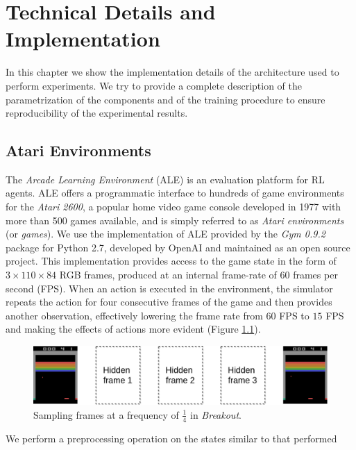 \chapter{Technical Details and Implementation}
\label{chapter5_technical_details}
\thispagestyle{empty}

\vspace{0.5cm}

In this chapter we show the implementation details of the architecture
used to perform experiments. We try to provide a complete description of the 
parametrization of the components and of the training procedure to ensure 
reproducibility of the experimental results.

\section{Atari Environments}
The \textit{Arcade Learning Environment} (ALE) \cite{bellemare2013arcade} is an 
evaluation platform for RL agents.
ALE offers a programmatic interface to hundreds of game environments for the 
\textit{Atari 2600}, a popular home video game console developed in 1977 with 
more than 500 games available, and is simply referred to as 
\textit{Atari environments} (or \textit{games}). 
We use the implementation of ALE provided by the \textit{Gym 0.9.2} package for 
Python 2.7, developed by OpenAI and maintained as an open source project. 
This implementation provides access to the game state in the form of 
$3 \times 110 \times 84$ RGB frames, produced at an internal frame-rate of $60$ 
frames per second (FPS).
When an action is executed in the environment, the simulator repeats the action 
for four consecutive frames of the game and then provides another observation, 
effectively lowering the frame rate from $60$ FPS to $15$ FPS and making the 
effects of actions more evident (Figure \ref{f:sampling}). 
%
\begin{figure}[h]
\includegraphics[width=\textwidth]{pictures/sampling}
\centering
\caption[Sampling frames at a frequency of $\frac{1}{4}$ in \textit{Breakout}]{Sampling frames at a frequency of $\frac{1}{4}$ in \textit{Breakout}.}
\label{f:sampling}
\end{figure}
%
We perform a preprocessing operation on the states similar to that performed
